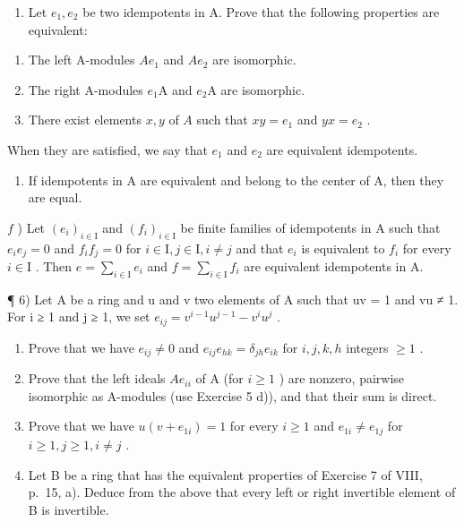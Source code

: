 \begin{enumerate}
\def\labelenumi{\alph{enumi})}
\setcounter{enumi}{3}
\tightlist
\item
  Let \(e_{1}, e_{2}\) be two idempotents in A. Prove that the following properties are equivalent:
\end{enumerate}

\begin{enumerate}
\def\labelenumi{(\roman{enumi})}
\item
  The left A-modules \(Ae_{1}\) and \(Ae_{2}\) are isomorphic.
\item
  The right A-modules \(e_1\mathrm{A}\) and \(e_2\mathrm{A}\) are isomorphic.
\item
  There exist elements \(x, y\) of \(A\) such that \(xy = e_1\) and \(yx = e_2\) .
\end{enumerate}

When they are satisfied, we say that \(e_{1}\) and \(e_{2}\) are equivalent idempotents.

\begin{enumerate}
\def\labelenumi{\alph{enumi})}
\setcounter{enumi}{4}
\tightlist
\item
  If idempotents in A are equivalent and belong to the center of A, then they are equal.
\end{enumerate}

\(f\) ) Let \((e_i)_{i\in \mathrm{I}}\) and \((f_{i})_{i\in \mathrm{I}}\) be finite families of idempotents in A such that \(e_i e_j = 0\) and \(f_{i} f_{j} = 0\) for \(i\in \mathrm{I}, j\in \mathrm{I}, i\neq j\) and that \(e_i\) is equivalent to \(f_{i}\) for every \(i\in \mathrm{I}\) . Then \(e = \sum_{i\in \mathrm{I}}e_i\) and \(f = \sum_{i\in \mathrm{I}}f_{i}\) are equivalent idempotents in A.

¶ 6) Let A be a ring and u and v two elements of A such that uv = 1 and vu ≠ 1. For i ≥ 1 and j ≥ 1, we set \(e_{ij} = v^{i-1}u^{j-1} - v^i u^j\) .

\begin{enumerate}
\def\labelenumi{\alph{enumi})}
\item
  Prove that we have \(e_{ij} \neq 0\) and \(e_{ij}e_{hk} = \delta_{jh}e_{ik}\) for \(i,j,k,h\) integers \(\geqslant 1\) .
\item
  Prove that the left ideals \(Ae_{ii}\) of A (for \(i \geqslant 1\) ) are nonzero, pairwise isomorphic as A-modules (use Exercise 5 d)), and that their sum is direct.
\item
  Prove that we have \(u(v + e_{1i}) = 1\) for every \(i \geqslant 1\) and \(e_{1i} \neq e_{1j}\) for \(i \geqslant 1, j \geqslant 1, i \neq j\) .
\item
  Let B be a ring that has the equivalent properties of Exercise 7 of VIII, p.~15, a). Deduce from the above that every left or right invertible element of B is invertible.
\end{enumerate}

